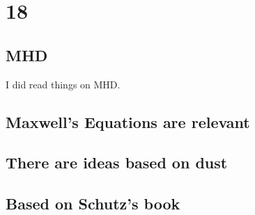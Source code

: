 \chapter{18}

\section{MHD}

I did read things on MHD. 

\section{Maxwell's Equations are relevant}

\section{There are ideas based on dust}


\section{Based on Schutz's book}